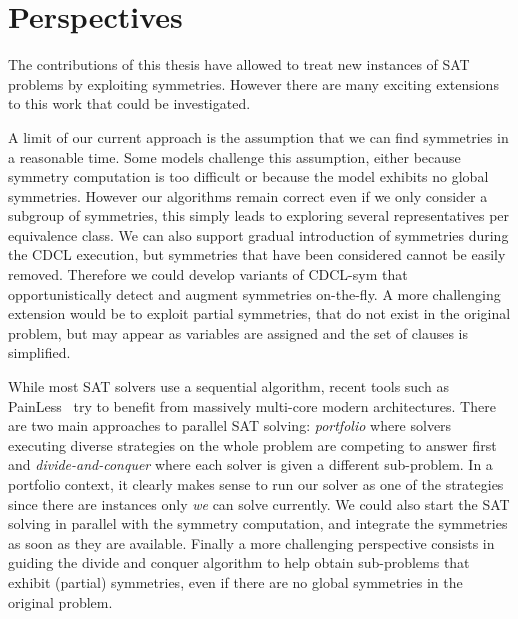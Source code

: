 \section{Perspectives}


The contributions of this thesis have allowed to treat new instances of SAT problems by exploiting symmetries.
However there are many exciting extensions to this work that could be investigated.

A limit of our current approach is the assumption that we can find symmetries in a reasonable time.
Some models challenge this assumption, either because symmetry computation is too difficult 
or because the model exhibits no global symmetries. 
However our algorithms remain correct even if we only consider a subgroup of symmetries, 
this simply leads to exploring several representatives per equivalence class.
We can also support gradual introduction of symmetries during the CDCL execution, 
but symmetries that have been considered cannot be easily removed.  
Therefore we could develop variants of CDCL-sym that opportunistically detect and augment symmetries 
on-the-fly.
A more challenging extension would be to exploit partial symmetries, that do not exist in the original 
problem, but may appear as variables are assigned and the set of clauses is simplified.

While most SAT solvers use a sequential algorithm, recent tools such as PainLess~\cite{le2017painless} try to benefit from massively multi-core modern architectures. 
There are two main approaches to parallel SAT solving: 
\emph{portfolio} where solvers executing diverse strategies on the whole problem are competing to answer first  and
\emph{divide-and-conquer} where each solver is given a different sub-problem.
In a portfolio context, it clearly makes sense to run our solver as one of the strategies since there are instances
 only \emph{we} can solve currently.
We could also start the SAT solving in parallel with the symmetry computation, and integrate the 
symmetries as soon as they are available.
Finally a more challenging perspective consists in guiding the divide and conquer algorithm to 
help obtain sub-problems that exhibit (partial) symmetries, even if there are no global symmetries in the original problem. 





